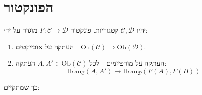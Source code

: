 \documentclass{tstextbook}
\begin{document}
\section{הפונקטור}

\begin{definition}[פונקטור]
יהיו \(\mathcal{C,D}\) קטגוריות. פונקטור \(F:\mathcal{C}\to \mathcal{D}\) מוגדר על ידי:

  \begin{enumerate}
    \item העתקה על אובייקטים - \(\mathrm{Ob}(\mathcal{C})\to \mathrm{Ob}(\mathcal{D})\). 


    \item העתקה על מורפיזמים - לכל \(A,A' \in \mathrm{Ob}(\mathcal{C})\) העתקה: 
$$\mathrm{Hom}_{\mathcal{C} }(A,A')\to \mathrm{Hom}_{\mathcal{D} }(F(A),F(B))$$


  \end{enumerate}
\end{definition}
כך שמתקיים:
\end{document}
